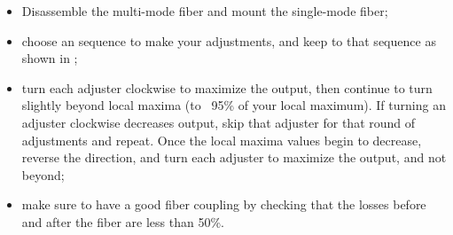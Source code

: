 \begin{itemize}
  \item Disassemble the multi-mode fiber and mount the single-mode fiber;
  \item choose an sequence to make your adjustments, and keep to that sequence as shown in ;
  \item turn each adjuster clockwise to maximize the output, then continue to turn slightly beyond local maxima (to ~95\% of your local maximum). If turning an adjuster clockwise decreases output, skip that adjuster for that round of adjustments and repeat. Once the local maxima values begin to decrease, reverse the direction, and turn each adjuster to maximize the output, and not beyond;
  \item make sure to have a good fiber coupling by checking that the losses before and after the fiber are less than 50\%.
\end{itemize}
